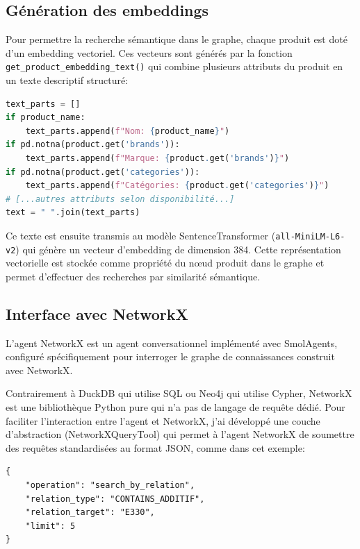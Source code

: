 \documentclass[a4paper,11pt]{article}
\begin{document}
\newpage

\subsection{Génération des embeddings}

Pour permettre la recherche sémantique dans le graphe, chaque produit est doté d'un embedding vectoriel. Ces vecteurs sont générés par la fonction \texttt{get\_product\_embedding\_text()} qui combine plusieurs attributs du produit en un texte descriptif structuré:

\begin{lstlisting}[language=Python, caption=Génération du texte pour l'embedding]
text_parts = []
if product_name:
    text_parts.append(f"Nom: {product_name}")
if pd.notna(product.get('brands')):
    text_parts.append(f"Marque: {product.get('brands')}")
if pd.notna(product.get('categories')):
    text_parts.append(f"Catégories: {product.get('categories')}")
# [...autres attributs selon disponibilité...]
text = " ".join(text_parts)
\end{lstlisting}

Ce texte est ensuite transmis au modèle SentenceTransformer (\texttt{all-MiniLM-L6-v2}) qui génère un vecteur d'embedding de dimension 384. Cette représentation vectorielle est stockée comme propriété du n\oe ud produit dans le graphe et permet d'effectuer des recherches par similarité sémantique.

\subsection{Interface avec NetworkX}

L'agent NetworkX est un agent conversationnel implémenté avec SmolAgents, configuré spécifiquement pour interroger le graphe de connaissances construit avec NetworkX.

Contrairement à DuckDB qui utilise SQL ou Neo4j qui utilise Cypher, NetworkX est une bibliothèque Python pure qui n'a pas de langage de requête dédié. Pour faciliter l'interaction entre l'agent et NetworkX, j'ai développé une couche d'abstraction (NetworkXQueryTool) qui permet à l'agent NetworkX de soumettre des requêtes standardisées au format JSON, comme dans cet exemple:

\begin{lstlisting}[caption=Exemple de requête JSON pour NetworkX]
{
    "operation": "search_by_relation",
    "relation_type": "CONTAINS_ADDITIF",
    "relation_target": "E330",
    "limit": 5
}
\end{lstlisting}
\end{document}
